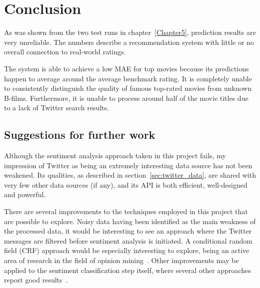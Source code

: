 
\chapter{Conclusion} %

\label{Chapter6}




As was shown from the two test runs in chapter~\ref{Chapter5}, prediction results are very unreliable. The numbers describe a recommendation system with little or no overall connection to real-world ratings.

The system is able to achieve a low MAE for top movies because its predictions happen to average around the average benchmark rating. It is completely unable to consistently distinguish the quality of famous top-rated movies from unknown B-films. Furthermore, it is unable to process around half of the movie titles due to a lack of Twitter search results.

\section{Suggestions for further work} %
\label{sec:suggestions_for_further_work}

Although the sentiment analysis approach taken in this project fails, my impression of Twitter as being an extremely interesting data source has not been weakened. Its qualities, as described in section~\ref{sec:twitter_data}, are shared with very few other data sources (if any), and its API is both efficient, well-designed and powerful.

There are several improvements to the techniques employed in this project that are possible to explore. Noisy data having been identified as the main weakness of the processed data, it would be interesting to see an approach where the Twitter messages are filtered before sentiment analysis is initiated. A conditional random field (CRF) approach would be especially interesting to explore, being an active area of research in the field of opinion mining~\cite{Choi:2005:ISO:1220575.1220620, Jakob:2010:EOT:1870658.1870759, Yang:2012:EOE:2390948.2391100}. Other improvements may be applied to the sentiment classification step itself, where several other approaches report good results~\cite{agarwal2011sentiment, go2009twitterdistant, go2009twitter, kouloumpis2011twitter, pak2010twitter}.

